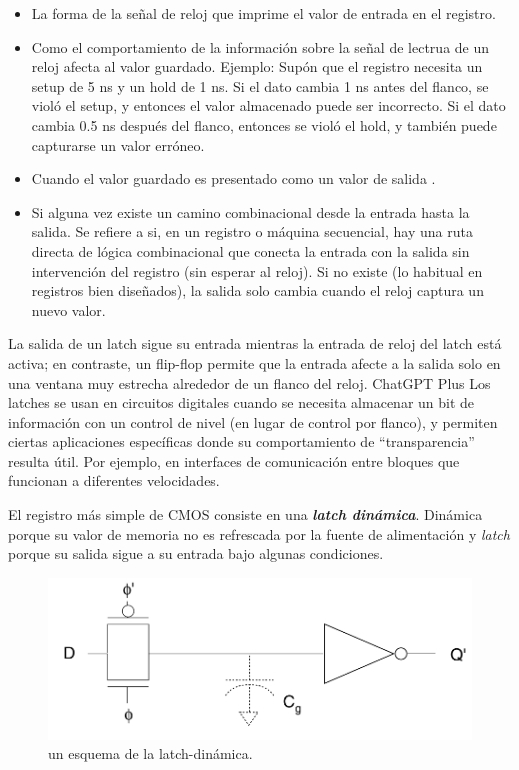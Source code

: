 \begin{itemize}
    \item La forma de la señal de reloj que imprime el valor de entrada en el registro. 
    \item Como el comportamiento de la información sobre la señal de lectrua de un reloj afecta al valor guardado. Ejemplo: Supón que el registro necesita un setup de 5 ns y un hold de 1 ns. Si el dato cambia 1 ns antes del flanco, se violó el setup, y entonces el valor almacenado puede ser incorrecto. Si el dato cambia 0.5 ns después del flanco, entonces se violó el hold, y también puede capturarse un valor erróneo.
    \item Cuando el valor guardado es presentado como un valor de salida . 
    \item Si alguna vez existe un camino combinacional desde la entrada hasta la salida. Se refiere a si, en un registro o máquina secuencial, hay una ruta directa de lógica combinacional que conecta la entrada con la salida sin intervención del registro (sin esperar al reloj). Si no existe (lo habitual en registros bien diseñados), la salida solo cambia cuando el reloj captura un nuevo valor.
\end{itemize}
La salida de un latch sigue su entrada mientras la entrada de reloj del latch está activa; en contraste, un flip-flop permite que la entrada afecte a la salida solo en una ventana muy estrecha alrededor de un flanco del reloj. ChatGPT Plus Los latches se usan en circuitos digitales cuando se necesita almacenar un bit de información con un control de nivel (en lugar de control por flanco), y permiten ciertas aplicaciones específicas donde su comportamiento de “transparencia” resulta útil. Por ejemplo, en interfaces de comunicación entre bloques que funcionan a diferentes velocidades.

El registro más simple de CMOS consiste en una \textbf{\textit{latch dinámica}}. Dinámica porque su valor de memoria no es refrescada por la fuente de alimentación y \textit{latch} porque su salida sigue a su entrada bajo algunas condiciones.  

\begin{figure}[H] \centering
    \includegraphics[width=0.7\linewidth]{Imagenes/02-LatchDinamica.png}
    \caption{un esquema de la latch-dinámica.}
    \label{Fig:02-LatchDinamica}
\end{figure}


